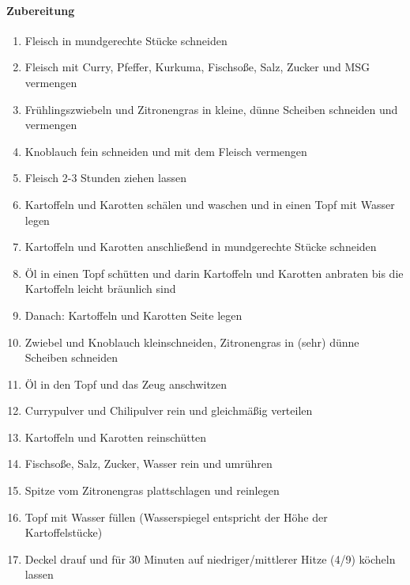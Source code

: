 \paragraph{Zubereitung}
\begin{enumerate}[noitemsep]
	\item Fleisch in mundgerechte Stücke schneiden
	\item Fleisch mit Curry, Pfeffer, Kurkuma, Fischsoße, Salz, Zucker und MSG vermengen
	\item Frühlingszwiebeln und Zitronengras in kleine, dünne Scheiben schneiden und vermengen
	\item Knoblauch fein schneiden und mit dem Fleisch vermengen
	\item Fleisch 2-3 Stunden ziehen lassen
	
	\newpage
	\item Kartoffeln und Karotten schälen und waschen und in einen Topf mit Wasser legen
	\item Kartoffeln und Karotten anschließend in mundgerechte Stücke schneiden
	\item Öl in einen Topf schütten und darin Kartoffeln und Karotten anbraten bis die Kartoffeln leicht bräunlich sind
	\item Danach: Kartoffeln und Karotten Seite legen
	\item Zwiebel und Knoblauch kleinschneiden, Zitronengras in (sehr) dünne Scheiben schneiden
	\item Öl in den Topf und das Zeug anschwitzen
	\item Currypulver und Chilipulver rein und gleichmäßig verteilen
	\item Kartoffeln und Karotten reinschütten
	\item Fischsoße, Salz, Zucker, Wasser rein und umrühren
	\item Spitze vom Zitronengras plattschlagen und reinlegen
	\item Topf mit Wasser füllen (Wasserspiegel entspricht der Höhe der Kartoffelstücke)
	\item Deckel drauf und für 30 Minuten auf niedriger/mittlerer Hitze (4/9) köcheln lassen

\end{enumerate}
